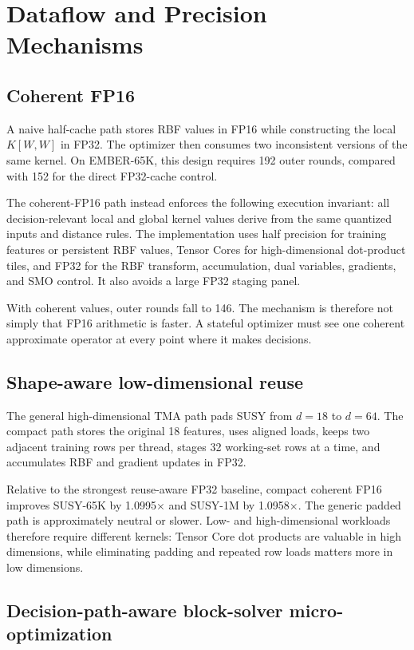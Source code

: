 \section{Dataflow and Precision Mechanisms}

\subsection{Coherent FP16}

A naive half-cache path stores RBF values in FP16 while constructing the local
$K[W,W]$ in FP32. The optimizer then consumes two inconsistent versions of
the same kernel. On EMBER-65K, this design requires 192 outer rounds, compared
with 152 for the direct FP32-cache control.

The coherent-FP16 path instead enforces the following execution invariant:
all decision-relevant local and global kernel values derive from the same
quantized inputs and distance rules. The implementation uses half precision
for training features or persistent RBF values, Tensor Cores for
high-dimensional dot-product tiles, and FP32 for the RBF transform,
accumulation, dual variables, gradients, and SMO control. It also avoids a
large FP32 staging panel.

With coherent values, outer rounds fall to 146. The mechanism is therefore not
simply that FP16 arithmetic is faster. A stateful optimizer must see one
coherent approximate operator at every point where it makes decisions.

\subsection{Shape-aware low-dimensional reuse}

The general high-dimensional TMA path pads SUSY from $d=18$ to $d=64$. The
compact path stores the original 18 features, uses aligned  loads,
keeps two adjacent training rows per thread, stages 32 working-set rows at a
time, and accumulates RBF and gradient updates in FP32.

Relative to the strongest reuse-aware FP32 baseline, compact coherent FP16
improves SUSY-65K by 1.0995$\times$ and SUSY-1M by 1.0958$\times$. The generic
padded path is approximately neutral or slower. Low- and high-dimensional
workloads therefore require different kernels: Tensor Core dot products are
valuable in high dimensions, while eliminating padding and repeated row loads
matters more in low dimensions.

\subsection{Decision-path-aware block-solver micro-optimization}

